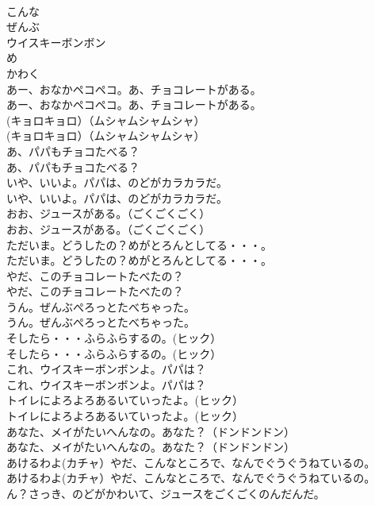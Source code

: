 \documentclass[8pt]{extreport}
\begin{document}
\begin{CJK}{UTF8}{min}
\\	こんな
\\	ぜんぶ
\\	ウイスキーボンボン
\\	め
\\	かわく
\\	あー、おなかペコペコ。あ、チョコレートがある。	
\\	あー、おなかペコペコ。あ、チョコレートがある。 
\\	(キョロキョロ）（ムシャムシャムシャ）	
\\	(キョロキョロ）（ムシャムシャムシャ） 
\\	あ、パパもチョコたべる？	
\\	あ、パパもチョコたべる？ 
\\	いや、いいよ。パパは、のどがカラカラだ。	
\\	いや、いいよ。パパは、のどがカラカラだ。 
\\	おお、ジュースがある。（ごくごくごく）	
\\	おお、ジュースがある。（ごくごくごく） 
\\	ただいま。どうしたの？めがとろんとしてる・・・。	
\\	ただいま。どうしたの？めがとろんとしてる・・・。 
\\	やだ、このチョコレートたべたの？	
\\	やだ、このチョコレートたべたの？ 
\\	うん。ぜんぶぺろっとたべちゃった。	
\\	うん。ぜんぶぺろっとたべちゃった。 
\\	そしたら・・・ふらふらするの。(ヒック）	
\\	そしたら・・・ふらふらするの。(ヒック） 
\\	これ、ウイスキーボンボンよ。パパは？	
\\	これ、ウイスキーボンボンよ。パパは？ 
\\	トイレによろよろあるいていったよ。(ヒック）	
\\	トイレによろよろあるいていったよ。(ヒック） 
\\	あなた、メイがたいへんなの。あなた？（ドンドンドン）	
\\	あなた、メイがたいへんなの。あなた？（ドンドンドン） 
\\	あけるわよ(カチャ）やだ、こんなところで、なんでぐうぐうねているの。	
\\	あけるわよ(カチャ）やだ、こんなところで、なんでぐうぐうねているの。 
\\	ん？さっき、のどがかわいて、ジュースをごくごくのんだんだ。	

\end{CJK}
\end{document}
